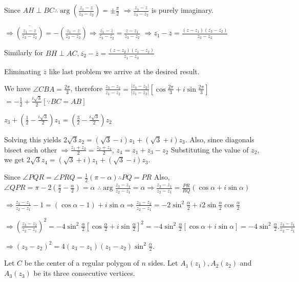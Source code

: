   Since $AH\perp BC \therefore \arg\left(\frac{z_1 - z}{z_3 - z_2}\right) = \pm\frac{\pi}{2}$
  $\Rightarrow \frac{z_1 - z}{z_3 - z_2}$ is purely imaginary.

  $\Rightarrow \overline{\left(\frac{z_1 - z}{z_3 - z_2}\right)} = -\left(\frac{z_1 - z}{z_3 -
    z_2}\right)\Rightarrow\frac{\overline{z_1} - \overline{z}}{\overline{z_3} - \overline{z_2}} = \frac{z - z_1}{z_3 - z_2}$
  $\Rightarrow \overline{z_1} - \overline{z} = \frac{(z - z_1)(\overline{z_3} - \overline{z_2})}{z_3 - z_2}$

  Similarly for $BH\perp AC, \overline{z_2} - \overline{z} = \frac{(z - z_2)(\overline{z_1} - \overline{z_2})}{z_1 - z_3}$

  Eliminating $\overline{z}$ like last problem we arrive at the desired result.
\item We have $\angle CBA =\frac{2\pi}{3}$, therefore
  $\frac{z_3 - z_2}{z_1 - z_2} = \frac{|z_3 - z_2|}{|z_1 - z_2|}\left[\cos\frac{2\pi}{3} + i\sin\frac{2\pi}{3}\right]$
  $= -\frac{1}{2} + \frac{i\sqrt{3}}{2}[\because BC = AB]$

  $z_3 + \left(\frac{1}{2} - \frac{i\sqrt{3}}{2}\right)z_1 = \left(\frac{3}{2} - \frac{i\sqrt{3}}{2}\right)z_2$

  Solving this yields $2\sqrt{3}z_2 = (\sqrt{3} - i)z_1 + (\sqrt{3} + i)z_3$.
  Also, since diagonals bisect each other $\Rightarrow \frac{z_1 + z_3}{2} = \frac{z_2 + z_4}{2}$,
  $z_4 = z_1 + z_3 - z_2$
  Substituting the value of $z_2$, we get
  $2\sqrt{3}z_4 = (\sqrt{3} + i)z_1 + (\sqrt{3} - i)z_3$.
\item Since $\angle PQR = \angle PRQ = \frac{1}{2}(\pi - \alpha) \therefore PQ = PR$ Also, $\angle QPR = \pi
  - 2\left(\frac{\pi}{2} - \frac{\alpha}{2}\right) = \alpha$
  $\therefore \arg\frac{z_3 - z_1}{z_2 - z_1} = \alpha \Rightarrow \frac{z_3 - z_1}{z_2 - z_1} =
  \frac{PR}{RQ}(\cos\alpha + i\sin\alpha)$

  $\Rightarrow \frac{z_3 - z_1}{z_2 - z_1} -1 = (\cos\alpha - 1) + i\sin\alpha \Rightarrow \frac{z_3 -
    z_2}{z_2 - z_1} = -2\sin^2\frac{\alpha}{2} + i2\sin\frac{\alpha}{2}\cos\frac{\alpha}{2}$

  $\Rightarrow \left(\frac{z_3 - z_2}{z_2 - z_1}\right)^2 =
  -4\sin^2\frac{\alpha}{2}\left[\cos\frac{\alpha}{2} + i\sin\frac{\alpha}{2}\right]^2 =
  -4\sin^2\frac{\alpha}{2}[\cos\alpha + i\sin\alpha] = -4\sin^2\frac{\alpha}{2}.\frac{z_3 - z_1}{z_2 - z_1}$

  $\Rightarrow (z_3 - z_2)^2 = 4(z_3 - z_1)(z_1 - z_2)\sin^2\frac{\alpha}{2}$.
\item Let $C$ be the center of a regular polygon of $n$ sides. Let $A_1(z_1), A_2(z_2)$ and $A_3(z_3)$ be its three
  consecutive vertices.

